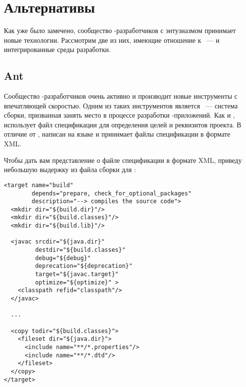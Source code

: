 \section{Альтернативы \GNUmake{}}

Как уже было замечено, сообщество \Java{}\hyp{}разработчиков с
энтузиазмом принимает новые технологии. Рассмотрим две из них, имеющие
отношение к \GNUmake{}~---  и интегрированные среды
разработки.

\subsection{Ant}
Сообщество \Java{}\hyp{}разработчиков очень активно и производит новые
инструменты с впечатляющей скоростью. Одним из таких инструментов
является ~--- система сборки, призванная занять место
\GNUmake{} в процессе разработки \Java{}\hyp{}приложений. Как и
\GNUmake{},  использует файл спецификации для определения
целей и реквизитов проекта. В отличие от \GNUmake{}, 
написан на языке \Java{} и принимает файлы спецификации в формате XML.

Чтобы дать вам представление о файле спецификации в формате XML,
приведу небольшую выдержку из файла сборки для :

{\footnotesize
\begin{verbatim}
<target name="build"
        depends="prepare, check_for_optional_packages"
        description="--> compiles the source code">
  <mkdir dir="${build.dir}"/>
  <mkdir dir="${build.classes}"/>
  <mkdir dir="${build.lib}"/>

  <javac srcdir="${java.dir}"
         destdir="${build.classes}"
         debug="${debug}"
         deprecation="${deprecation}"
         target="${javac.target}"
         optimize="${optimize}" >
    <classpath refid="classpath"/>
  </javac>
  
  ...

  <copy todir="${build.classes}">
    <fileset dir="${java.dir}">
      <include name="**/*.properties"/>
      <include name="**/*.dtd"/>
    </fileset>
  </copy>
</target>
\end{verbatim}
}

